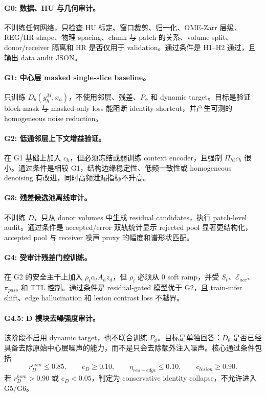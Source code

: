 \documentclass[11pt,a4paper,UTF8,fontset=fandol]{ctexart}
\theoremstyle{definition}
\begin{document}
\paragraph{G0: 数据、HU 与几何审计。}
不训练任何网络，只检查 HU 标定、窗口裁剪、归一化、OME-Zarr 层级、REG/HR shape、物理 spacing、chunk 与 patch 的关系、volume split、donor/receiver 隔离和 HR 是否仅用于 validation。通过条件是 H1--H2 通过，且输出 data audit JSON。

\paragraph{G1: 中心层 masked single-slice baseline。}
只训练 $D_\theta(y_h^M,x_h)$，不使用邻层、残差、$P_\phi$ 和 dynamic target。目标是验证 block mask 与 masked-only loss 能阻断 identity shortcut，并产生可测的 homogeneous noise reduction。

\paragraph{G2: 低通邻层上下文增益验证。}
在 G1 基础上加入 $c_h$，但必须冻结或弱训练 context encoder，且强制 $\Pi_{hi}c_h$ 很小。通过条件是相较 G1，结构边缘稳定性、低频一致性或 homogeneous denoising 有改进，同时高频泄漏指标不升高。

\paragraph{G3: 残差候选池离线审计。}
不训练 $D$，只从 donor volumes 中生成 residual candidates，执行 patch-level audit。通过条件是 accepted/error 双轨统计显示 rejected pool 显著更结构化，accepted pool 与 receiver 噪声 proxy 的幅度和谱形状匹配。

\paragraph{G4: 受审计残差门控训练。}
在 G2 的安全主干上加入 $\rho_t\alpha_t A_hz_d$，但 $\rho_t$ 必须从 $0$ soft ramp，并受 $S_t$、$\mathcal E_{acc}$、$\pi_{pass}$ 和 TTL 控制。通过条件是 residual-gated 模型优于 G2，且 train-infer shift、edge hallucination 和 lesion contrast loss 不越界。

\paragraph{G4.5: D 模块去噪强度审计。}
该阶段不启用 dynamic target，也不联合训练 $P_\phi$。目标是单独回答：$D_\theta$ 是否已经具备去除原始中心层噪声的能力，而不是只会去除额外注入噪声。核心通过条件包括
\begin{equation}
    r_D^{hom}\le 0.85,\qquad e_D\ge 0.10,\qquad
    \eta_{res-edge}\le 0.10,\qquad c_{lesion}\ge 0.90.
\end{equation}
若 $r_D^{hom}>0.90$ 或 $e_D<0.05$，判定为 conservative identity collapse，不允许进入 G5/G6。
\end{document}
